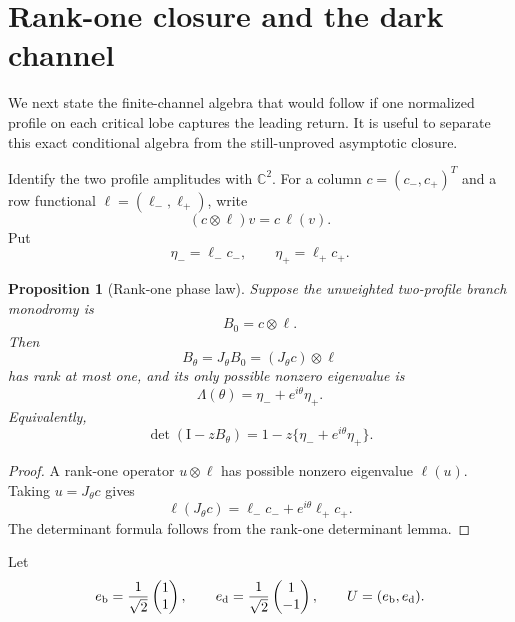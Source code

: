 \documentclass[11pt]{article}
\newtheorem{proposition}[theorem]{Proposition}
\theoremstyle{definition}
\theoremstyle{remark}
\newcommand{\C}{\mathbb C}
\newcommand{\Id}{\mathrm I}
\begin{document}
\section{Rank-one closure and the dark channel}
\label{sec:rank-one}

We next state the finite-channel algebra that would follow if one normalized
profile on each critical lobe captures the leading return.  It is useful to
separate this exact conditional algebra from the still-unproved asymptotic
closure.

Identify the two profile amplitudes with $\C^2$.  For a column
$c=(c_-,c_+)^T$ and a row functional
$\ell=(\ell_-,\ell_+)$, write
\begin{equation}\label{eq:rank-one-product}
 (c\otimes\ell)v=c\,\ell(v).
\end{equation}
Put
\begin{equation}\label{eq:eta-components}
 \eta_-=\ell_-c_-,
 \qquad
 \eta_+=\ell_+c_+.
\end{equation}

\begin{proposition}[Rank-one phase law]
\label{prop:rank-one-phase}
Suppose the unweighted two-profile branch monodromy is
\begin{equation}\label{eq:rank-one-assumption}
 B_0=c\otimes\ell.
\end{equation}
Then
\begin{equation}\label{eq:rank-one-twist}
 B_\theta=J_\theta B_0=(J_\theta c)\otimes\ell
\end{equation}
has rank at most one, and its only possible nonzero eigenvalue is
\begin{equation}\label{eq:rank-one-eigenvalue}
 \boxed{\Lambda(\theta)
 =\eta_-+e^{i\theta}\eta_+.}
\end{equation}
Equivalently,
\begin{equation}\label{eq:rank-one-determinant}
 \det(\Id-zB_\theta)
 =1-z\{\eta_-+e^{i\theta}\eta_+\}.
\end{equation}
\end{proposition}

\begin{proof}
A rank-one operator $u\otimes\ell$ has possible nonzero eigenvalue
$\ell(u)$.  Taking $u=J_\theta c$ gives
\[
 \ell(J_\theta c)=\ell_-c_-+e^{i\theta}\ell_+c_+.
\]
The determinant formula follows from the rank-one determinant lemma.
\end{proof}

Let
\begin{equation}\label{eq:bright-dark-basis}
 e_{\rm b}=\frac1{\sqrt2}\begin{pmatrix}1\\1\end{pmatrix},
 \qquad
 e_{\rm d}=\frac1{\sqrt2}\begin{pmatrix}1\\-1\end{pmatrix},
 \qquad
 U=(e_{\rm b},e_{\rm d}).
\end{equation}
\end{document}
